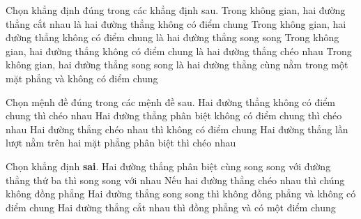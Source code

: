 \begin{ex}%
	Chọn khẳng định đúng trong các khẳng định sau. 
	 \choice
		{Trong không gian, hai đường thẳng cắt nhau là  hai đường thẳng không có điểm chung}
		{Trong không gian,  hai đường thẳng không có điểm chung là hai đường thẳng song song}
		{Trong không gian, hai đường thẳng  không có điểm chung là hai đường thẳng chéo nhau}
		{\True Trong không gian, hai đường  thẳng song song là hai đường thẳng cùng nằm trong một mặt phẳng và không có điểm chung}
\end{ex}

\begin{ex}%
	Chọn mệnh đề đúng trong các mệnh đề sau. 
	\choice 
		{Hai đường thẳng không có điểm chung thì  chéo nhau}
		{Hai đường thẳng  phân biệt không có điểm chung thì chéo nhau}
		{\True Hai  đường thẳng chéo nhau thì không có điểm chung}
		{Hai đường thẳng lần  lượt nằm trên hai mặt phẳng phân biệt thì chéo nhau}
\end{ex}

\begin{ex}%
	Chọn khẳng  định {\bf sai}.
	 \choice
		{Hai đường thẳng  phân biệt cùng song song với đường thẳng thứ ba thì song song với nhau}
		 {Nếu hai đường thẳng chéo nhau thì chúng không đồng phẳng}
		{\True Hai đường thẳng song song thì  không đồng phẳng và không có điểm chung}
		{Hai đường thẳng cắt nhau thì đồng phẳng và có một điểm chung} 
\end{ex}

